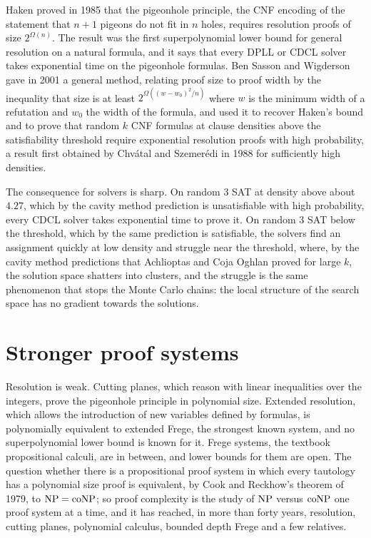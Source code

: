 Haken proved in 1985 that the pigeonhole principle, the CNF encoding of the statement that $n + 1$ pigeons do not fit in $n$ holes, requires resolution proofs of size $2^{\Omega(n)}$. The result was the first superpolynomial lower bound for general resolution on a natural formula, and it says that every DPLL or CDCL solver takes exponential time on the pigeonhole formulas. Ben Sasson and Wigderson gave in 2001 a general method, relating proof size to proof width by the inequality that size is at least $2^{\Omega((w - w_0)^2 / n)}$ where $w$ is the minimum width of a refutation and $w_0$ the width of the formula, and used it to recover Haken's bound and to prove that random $k$ CNF formulas at clause densities above the satisfiability threshold require exponential resolution proofs with high probability, a result first obtained by Chv\'atal and Szemer\'edi in 1988 for sufficiently high densities.

The consequence for solvers is sharp. On random $3$ SAT at density above about $4.27$, which by the cavity method prediction is unsatisfiable with high probability, every CDCL solver takes exponential time to prove it. On random $3$ SAT below the threshold, which by the same prediction is satisfiable, the solvers find an assignment quickly at low density and struggle near the threshold, where, by the cavity method predictions that Achlioptas and Coja Oghlan proved for large $k$, the solution space shatters into clusters, and the struggle is the same phenomenon that stops the Monte Carlo chains: the local structure of the search space has no gradient towards the solutions.

\section{Stronger proof systems}

Resolution is weak. Cutting planes, which reason with linear inequalities over the integers, prove the pigeonhole principle in polynomial size. Extended resolution, which allows the introduction of new variables defined by formulas, is polynomially equivalent to extended Frege, the strongest known system, and no superpolynomial lower bound is known for it. Frege systems, the textbook propositional calculi, are in between, and lower bounds for them are open. The question whether there is a propositional proof system in which every tautology has a polynomial size proof is equivalent, by Cook and Reckhow's theorem of 1979, to $\mathrm{NP} = \mathrm{co}\mathrm{NP}$; so proof complexity is the study of $\mathrm{NP}$ versus $\mathrm{co}\mathrm{NP}$ one proof system at a time, and it has reached, in more than forty years, resolution, cutting planes, polynomial calculus, bounded depth Frege and a few relatives.

